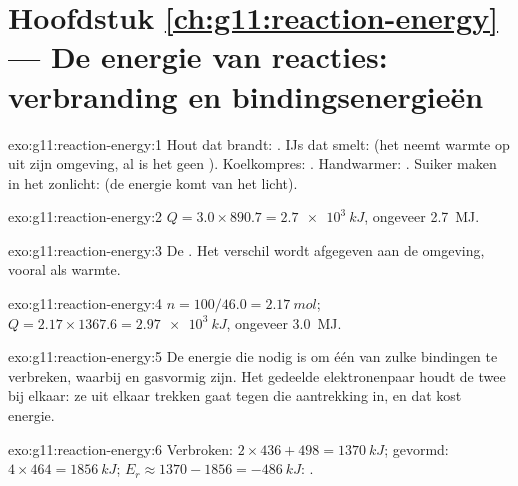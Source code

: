 \section*{Hoofdstuk \ref{ch:g11:reaction-energy} --- De energie van reacties: verbranding en bindingsenergieën}

\begin{solution}{exo:g11:reaction-energy:1}
Hout dat brandt: . IJs dat smelt:  (het neemt warmte op
uit zijn omgeving, al is het geen ). Koelkompres:
. Handwarmer: . Suiker maken in het zonlicht: 
(de energie komt van het licht).
\end{solution}

\begin{solution}{exo:g11:reaction-energy:2}
$Q = 3.0 \times 890.7 = \qty{2.7e3}{kJ}$, ongeveer \qty{2.7}{MJ}.
\end{solution}

\begin{solution}{exo:g11:reaction-energy:3}
De . Het verschil wordt afgegeven aan de omgeving, vooral als
warmte.
\end{solution}

\begin{solution}{exo:g11:reaction-energy:4}
$n = 100 / 46.0 = \qty{2.17}{mol}$; $Q = 2.17 \times 1367.6 =
\qty{2.97e3}{kJ}$, ongeveer \qty{3.0}{MJ}.
\end{solution}

\begin{solution}{exo:g11:reaction-energy:5}
De energie die nodig is om één  van zulke bindingen te verbreken,
waarbij  en  gasvormig zijn. Het gedeelde elektronenpaar
houdt de twee  bij elkaar: ze uit elkaar trekken gaat tegen die
aantrekking in, en dat kost energie.
\end{solution}

\begin{solution}{exo:g11:reaction-energy:6}
Verbroken: $2 \times 436 + 498 = \qty{1370}{kJ}$; gevormd:
$4 \times 464 = \qty{1856}{kJ}$; $E_r \approx 1370 - 1856 =
\qty{-486}{kJ}$: .
\end{solution}

